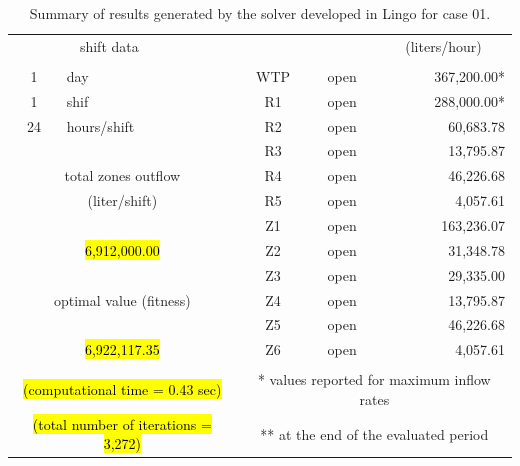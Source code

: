 \documentclass{singlecol}
\theoremstyle{TH}{
\newtheorem{lemma}{Lemma}
\newtheorem{theorem}[lemma]{Theorem}
\newtheorem{corrolary}[lemma]{Corrolary}
\newtheorem{conjecture}[lemma]{Conjecture}
\newtheorem{proposition}[lemma]{Proposition}
\newtheorem{claim}[lemma]{Claim}
\newtheorem{stheorem}[lemma]{Wrong Theorem}
\newtheorem{algorithm}{Algorithm}
}
\theoremstyle{THrm}{
\newtheorem{definition}{Definition}[section]
\newtheorem{question}{Question}[section]
\newtheorem{remark}{Remark}
\newtheorem{scheme}{Scheme}
}
\theoremstyle{THhit}{
\newtheorem{case}{Case}[section]
}
\begin{document}
\begin{table}[t]
\begin{center}
\begin{small}
\begin{tabular}{ c r r r r r }
		\multicolumn{2}{c}{shift data}     &   &      & \multicolumn{1}{c}{} & \multicolumn{1}{c}{(liters/hour)} \\
		   \\
		1   &  \multicolumn{1}{l}{day}   &              		& \multicolumn{1}{c}{WTP}    & \multicolumn{1}{c}{open} &  367,200.00* \\
		1   &  \multicolumn{1}{l}{shif}  &         			    & \multicolumn{1}{c}{R1}     & \multicolumn{1}{c}{open} &  288,000.00* \\
		24  &  \multicolumn{1}{l}{hours/shift}        &         & \multicolumn{1}{c}{R2}     & \multicolumn{1}{c}{open} &    60,683.78 \\
	   &      &              									& \multicolumn{1}{c}{R3}     & \multicolumn{1}{c}{open} &    13,795.87 \\
	   \multicolumn{3}{c}{total zones outflow}                  & \multicolumn{1}{c}{R4}     & \multicolumn{1}{c}{open} &    46,226.68 \\
	   \multicolumn{3}{c}{(liter/shift)}              			& \multicolumn{1}{c}{R5}     & \multicolumn{1}{c}{open} &     4,057.61 \\
	   &      &              									& \multicolumn{1}{c}{Z1}     & \multicolumn{1}{c}{open} &   163,236.07 \\
	   \multicolumn{3}{c}{\hl{6,912,000.00}}              			& \multicolumn{1}{c}{Z2}     & \multicolumn{1}{c}{open} &    31,348.78 \\
	      &              &              						& \multicolumn{1}{c}{Z3}     & \multicolumn{1}{c}{open} &    29,335.00 \\
	   \multicolumn{3}{c}{optimal value (fitness)}              & \multicolumn{1}{c}{Z4}     & \multicolumn{1}{c}{open} &    13,795.87 \\
	   &             &             						 		& \multicolumn{1}{c}{Z5}     & \multicolumn{1}{c}{open} &    46,226.68 \\
	   \multicolumn{3}{c}{\hl{6,922,117.35}}              			& \multicolumn{1}{c}{Z6}     & \multicolumn{1}{c}{open} &     4,057.61 \\
	   \\
	   \multicolumn{3}{c}{\hl{(computational time  = 0.43 sec)}}     & \multicolumn{3}{c}{* values reported for maximum inflow rates} \\
	   \multicolumn{3}{c}{\hl{(total number of iterations = 3,272)}}   & \multicolumn{3}{c}{** at the end of the evaluated period} 
	\end{tabular}
		\end{small}
\caption{Summary of results generated by the solver developed in Lingo for case 01.}
\label{tab:lingoEvalCase01}
\end{center}
\end{table}
\end{document}
